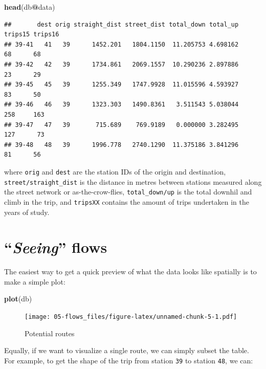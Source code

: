 \documentclass[
]{book}
\newenvironment{Shaded}{\begin{snugshade}}{\end{snugshade}}
\newcommand{\KeywordTok}[1]{\textcolor[rgb]{0.13,0.29,0.53}{\textbf{#1}}}
\newcommand{\NormalTok}[1]{#1}
\newcommand{\OperatorTok}[1]{\textcolor[rgb]{0.81,0.36,0.00}{\textbf{#1}}}
\begin{document}
\begin{Shaded}
\begin{Highlighting}[]
\KeywordTok{head}\NormalTok{(db}\OperatorTok{@}\NormalTok{data)}
\end{Highlighting}
\end{Shaded}

\begin{verbatim}
##       dest orig straight_dist street_dist total_down total_up trips15 trips16
## 39-41   41   39      1452.201   1804.1150  11.205753 4.698162      68      68
## 39-42   42   39      1734.861   2069.1557  10.290236 2.897886      23      29
## 39-45   45   39      1255.349   1747.9928  11.015596 4.593927      83      50
## 39-46   46   39      1323.303   1490.8361   3.511543 5.038044     258     163
## 39-47   47   39       715.689    769.9189   0.000000 3.282495     127      73
## 39-48   48   39      1996.778   2740.1290  11.375186 3.841296      81      56
\end{verbatim}

where \texttt{orig} and \texttt{dest} are the station IDs of the origin and destination, \texttt{street/straight\_dist} is the distance in metres between stations measured along the street network or as-the-crow-flies, \texttt{total\_down/up} is the total downhil and climb in the trip, and \texttt{tripsXX} contains the amount of trips undertaken in the years of study.

\hypertarget{seeing-flows}{%
\section{\texorpdfstring{``\emph{Seeing}'' flows}{``Seeing'' flows}}\label{seeing-flows}}

The easiest way to get a quick preview of what the data looks like spatially is to make a simple plot:

\begin{Shaded}
\begin{Highlighting}[]
\KeywordTok{plot}\NormalTok{(db)}
\end{Highlighting}
\end{Shaded}

\begin{figure}
\centering
\texttt{[image: 05-flows\_files/figure-latex/unnamed-chunk-5-1.pdf]}
\caption{\label{fig:unnamed-chunk-5}Potential routes}
\end{figure}

Equally, if we want to visualize a single route, we can simply subset the table. For example, to get the shape of the trip from station \texttt{39} to station \texttt{48}, we can:
\end{document}
